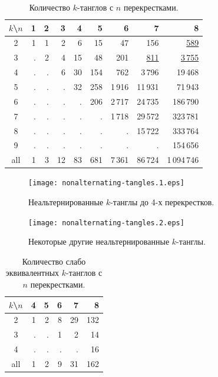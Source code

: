 \documentclass[12pt]{article}
\theoremstyle{plain}
\theoremstyle{definition}
\begin{document}
		\begin{table}[ht]
			\caption{Количество $k$-танглов с $n$ перекрестками.\label{table:non-alternating-tangles}}
			\centering
			\let\ul=\underline
			\begin{tabular}{|c||r|r|r|r|r|r|r|r|}
			\hline
			$k$\textbackslash $n$
			    & 1 & 2 &  3 &  4 &   5 &      6 &        7 &           8 \\
			\hline\hline
			2   & 1 & 1 &  2 &  6 &  15 &     47 &      156 &    \ul{589} \\
			3   & . & 2 &  4 & 15 &  48 &    201 & \ul{811} & \ul{3\,755} \\
			4   & . & . &  6 & 30 & 154 &    762 &   3\,796 &     19\,468 \\
			5   & . & . &  . & 32 & 258 & 1\,916 &  11\,931 &     71\,943 \\
			6   & . & . &  . &  . & 206 & 2\,717 &  24\,735 &    186\,790 \\
			7   & . & . &  . &  . &   . & 1\,718 &  29\,572 &    323\,781 \\
			8   & . & . &  . &  . &   . &      . &  15\,722 &    333\,764 \\
			9   & . & . &  . &  . &   . &      . &        . &    154\,656 \\
			\hline
			all & 1 & 3 & 12 & 83 & 681 & 7\,361 &  86\,724 & 1\,094\,746 \\
			\hline
			\end{tabular}
		\end{table}

		\begin{figure}[ht]
			\centering
			\texttt{[image: nonalternating-tangles.1.eps]}
			\caption{\footnotesize Неальтернированные $k$-танглы до 4-х перекрестков.\label{figure:nonalternating-tangles-4}}
		\end{figure}

		\begin{figure}[ht]
			\centering
			\texttt{[image: nonalternating-tangles.2.eps]}
			\caption{\footnotesize Некоторые другие неальтернированные $k$-танглы.\label{figure:nonalternating-tangles-rest}}
		\end{figure}

		\begin{table}[ht]
			\caption{Количество слабо эквивалентных $k$-танглов с $n$ перекрестками.\label{table:weak-tangles}}
			\centering
			\begin{tabular}{|c||r|r|r|r|r|}
			\hline
			$k$\textbackslash $n$
			    & 4 & 5 & 6 &  7 &   8 \\
			\hline\hline
			2   & 1 & 2 & 8 & 29 & 132 \\
			3   & . & . & 1 &  2 &  14 \\
			4   & . & . & . &  . &  16 \\
			\hline
			all & 1 & 2 & 9 & 31 & 162 \\
			\hline
			\end{tabular}
		\end{table}
\end{document}
